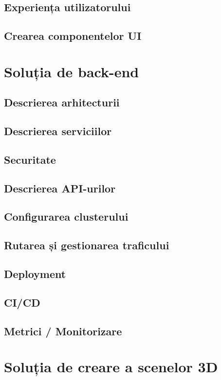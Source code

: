 \subsection{Experiența utilizatorului}
\subsection{Crearea componentelor UI}

\section{Soluția de back-end}
\label{sec:proj-backend}
\subsection{Descrierea arhitecturii}
\subsection{Descrierea serviciilor}
\subsection{Securitate}
\subsection{Descrierea API-urilor}
\subsection{Configurarea clusterului}
\subsection{Rutarea și gestionarea traficului}
\subsection{Deployment}
\subsection{CI/CD}
\subsection{Metrici / Monitorizare}

\section{Soluția de creare a scenelor 3D}
\label{sec:proj-3d}
